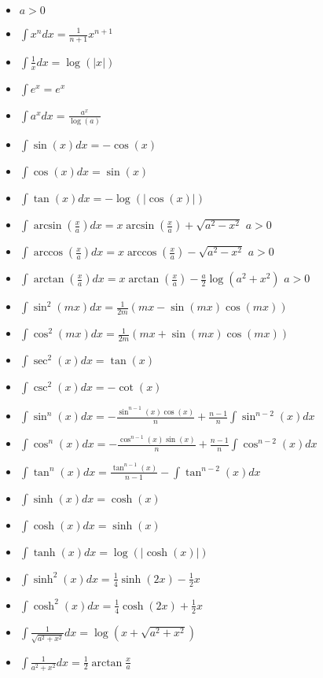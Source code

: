 \documentclass[12pt]{article}
\newcommand{\abs}[1]{\left\vert #1 \right\vert}
\begin{document}
\begin{multicols}{3}

\begin{itemize}
	\item $a > 0$
	\item $\int x^n dx = \frac{1}{n+1}x^{n+1}$
	\item $\int \frac{1}{x} dx = \log(\abs{x})$
	\item $\int e^x = e^x$
	\item $\int a^x dx = \frac{a^x}{\log(a)}$
	\item $\int \sin(x)dx = -\cos(x)$
	\item $\int \cos(x)dx = \sin(x)$
	\item $\int \tan(x)dx = -\log(\abs{\cos(x)})$
	\item $\int \arcsin\left( \frac{x}{a} \right)dx = x\arcsin\left(\frac{x}{a} \right)
		+ \sqrt{a^2 - x^2}$ $a > 0$
	\item $\int \arccos\left( \frac{x}{a}\right)dx = x\arccos\left(\frac{x}{a} \right)
		- \sqrt{a^2 - x^2}$ $a > 0$
	\item $\int \arctan\left( \frac{x}{a}\right)dx = x\arctan\left(\frac{x}{a} \right)
		- \frac{a}{2} \log\left(a^2+ x^2\right)$ $a > 0$
	\item $\int \sin^2(mx)dx = \frac{1}{2m}(mx-\sin(mx)\cos(mx))$
	\item $\int \cos^2(mx)dx = \frac{1}{2m}(mx+ \sin(mx)\cos(mx))$
	\item $\int \sec^2(x)dx = \tan(x)$
	\item $\int \csc^2(x)dx = -\cot(x)$
	\item $\int \sin^n(x)dx = - \frac{\sin^{n-1}(x)\cos(x)}{n} +
		\frac{n-1}{n}\int \sin^{n-2}(x)dx$
	\item $\int \cos^n(x)dx = - \frac{\cos^{n-1}(x)\sin(x)}{n} +
		\frac{n-1}{n}\int \cos^{n-2}(x)dx$
	\item $\int \tan^n(x)dx = \frac{\tan^{n-1}(x)}{n-1} - \int \tan^{n-2}(x)dx$
	\item $\int \sinh(x)dx = \cosh(x)$
	\item $\int \cosh(x)dx = \sinh(x)$
	\item $\int \tanh(x)dx = \log(\abs{\cosh(x)})$
	\item $\int \sinh^2(x)dx = \frac{1}{4}\sinh(2x) - \frac{1}{2}x$
	\item $\int \cosh^2(x)dx = \frac{1}{4}\cosh(2x) + \frac{1}{2}x$
	\item $\int \frac{1}{\sqrt{a^2 + x^2}}dx = \log \left( x + \sqrt{a^2 + x^2} \right)$
	\item $\int \frac{1}{a^2 + x^2}dx = \frac{1}{2}\arctan\frac{x}{a}$

\end{itemize}
\end{multicols}
\end{document}
